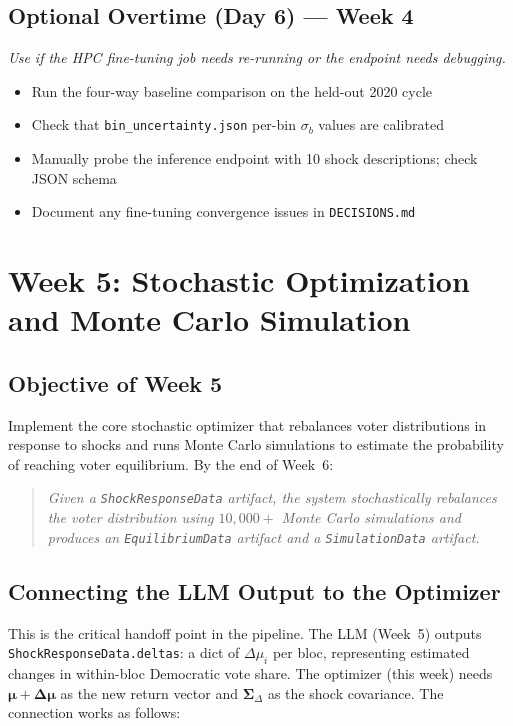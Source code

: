 \documentclass[11pt]{article}
\newcommand{\boldmu}{\boldsymbol{\mu}}
\newcommand{\boldSigma}{\boldsymbol{\Sigma}}
\begin{document}
\subsection*{Optional Overtime (Day 6) --- Week 4}
\textit{Use if the HPC fine-tuning job needs re-running or the endpoint needs debugging.}
\begin{itemize}[leftmargin=1.6em, itemsep=2pt]
  \item Run the four-way baseline comparison on the held-out 2020 cycle
  \item Check that \texttt{bin\_uncertainty.json} per-bin $\sigma_b$ values are calibrated
  \item Manually probe the inference endpoint with 10 shock descriptions; check JSON schema
  \item Document any fine-tuning convergence issues in \texttt{DECISIONS.md}
\end{itemize}

\section{Week 5: Stochastic Optimization and Monte Carlo Simulation}

\subsection*{Objective of Week 5}

Implement the core stochastic optimizer that rebalances voter distributions in response to shocks
and runs Monte Carlo simulations to estimate the probability of reaching voter equilibrium.
By the end of Week~6:

\begin{quote}
\textit{Given a \texttt{ShockResponseData} artifact, the system stochastically rebalances
the voter distribution using $10{,}000+$ Monte Carlo simulations and produces an
\texttt{EquilibriumData} artifact and a \texttt{SimulationData} artifact.}
\end{quote}

\subsection*{Connecting the LLM Output to the Optimizer}

This is the critical handoff point in the pipeline. The LLM (Week~5) outputs
\texttt{ShockResponseData.deltas}: a dict of $\Delta\mu_i$ per bloc, representing
estimated changes in within-bloc Democratic vote share. The optimizer (this week)
needs $\boldmu + \boldsymbol{\Delta\mu}$ as the new return vector and
$\boldSigma_\Delta$ as the shock covariance. The connection works as follows:
\end{document}

